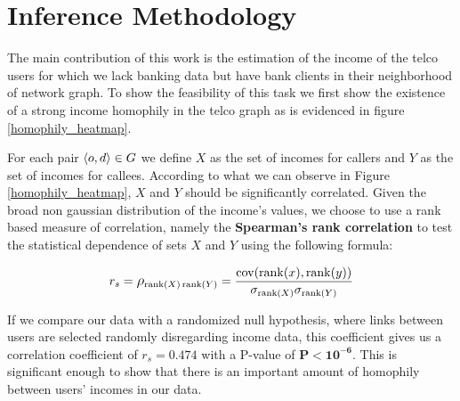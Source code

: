 \section{Inference Methodology}






The main contribution of this work is the estimation of the income of the telco users for which we lack banking data but have bank clients in their neighborhood of network graph. To show the feasibility of this task we first show the existence of a strong income homophily in the telco graph as is evidenced in figure \ref{homophily_heatmap}.

For each pair \( \left< o, d \right> \in \mathlarger{G} \) we define \( X \) as the set of incomes for callers and \( Y \) as the set of incomes for callees. According to what we can observe in Figure \ref{homophily_heatmap}, \( X \) and \( Y \) should be significantly correlated. Given the broad non gaussian distribution of the income's values, we choose to use a rank based measure of correlation, namely the \textbf{Spearman's rank correlation} to test the statistical dependence of sets \( X \) and \( Y \) using the following formula: 

\[
r_s = \mathlarger{\rho}_{\operatorname{rank}(X) \operatorname{rank}(Y)} = \frac{\operatorname{cov}(\operatorname{rank}(x), \operatorname{rank}(y))}{\sigma_{\operatorname{rank}(X)} \sigma_{\operatorname{rank}(Y)}}
\]

If we compare our data with a randomized null hypothesis, where links between users are selected randomly disregarding income data, this coefficient gives us a correlation coefficient of $r_s = \mathbf{0.474} $ with a P-value of $ \mathbf{P < 10^{-6}} $. This is significant enough to show that there is an important amount of homophily between users' incomes in our data.

